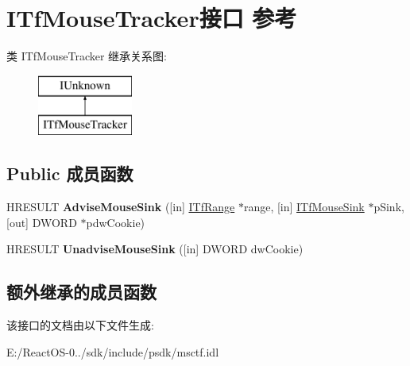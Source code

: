 \hypertarget{interface_i_tf_mouse_tracker}{}\section{I\+Tf\+Mouse\+Tracker接口 参考}
\label{interface_i_tf_mouse_tracker}
类 I\+Tf\+Mouse\+Tracker 继承关系图\+:\begin{figure}[H]
\begin{center}
\leavevmode
\includegraphics[height=2.000000cm]{interface_i_tf_mouse_tracker}
\end{center}
\end{figure}
\subsection*{Public 成员函数}
\begin{DoxyCompactItemize}
\item 
\mbox{\label{interface_i_tf_mouse_tracker_aae83ba0a705acb595956eca1259a4ae7}} 
H\+R\+E\+S\+U\+LT {\bfseries Advise\+Mouse\+Sink} (\mbox{[}in\mbox{]} \hyperlink{interface_i_tf_range}{I\+Tf\+Range} $\ast$range, \mbox{[}in\mbox{]} \hyperlink{interface_i_tf_mouse_sink}{I\+Tf\+Mouse\+Sink} $\ast$p\+Sink, \mbox{[}out\mbox{]} D\+W\+O\+RD $\ast$pdw\+Cookie)
\item 
\mbox{\label{interface_i_tf_mouse_tracker_ae0bd84e2abad637d8ad2a2060463adb9}} 
H\+R\+E\+S\+U\+LT {\bfseries Unadvise\+Mouse\+Sink} (\mbox{[}in\mbox{]} D\+W\+O\+RD dw\+Cookie)
\end{DoxyCompactItemize}
\subsection*{额外继承的成员函数}


该接口的文档由以下文件生成\+:\begin{DoxyCompactItemize}
\item 
E\+:/\+React\+O\+S-\/0../sdk/include/psdk/msctf.\+idl\end{DoxyCompactItemize}
